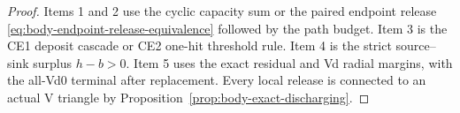 \begin{proof}
Items 1 and 2 use the cyclic capacity sum or the paired endpoint release
\eqref{eq:body-endpoint-release-equivalence} followed by the path budget.
Item 3 is the CE1 deposit cascade or CE2 one-hit threshold rule.  Item 4 is the
strict source--sink surplus \(h-b>0\).  Item 5 uses the exact residual and Vd
radial margins, with the all-Vd0 terminal after replacement.  Every local
release is connected to an actual V triangle by
Proposition~\ref{prop:body-exact-discharging}.
\end{proof}
